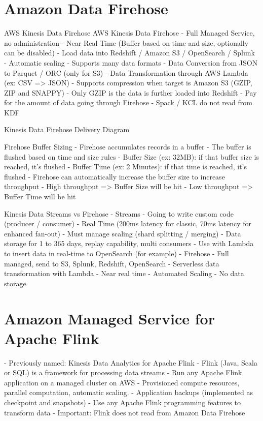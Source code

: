 \documentclass[11pt]{book}
\begin{document}
    \section{Amazon Data Firehose}
    AWS Kinesis Data Firehose
    AWS Kinesis Data Firehose
    - Full Managed Service, no administration
    - Near Real Time (Buffer based on time and size, optionally can be disabled)
    - Load data into Redshift / Amazon S3 / OpenSearch  / Splunk
    - Automatic scaling
    - Supports many data formats
    - Data Conversion from JSON to Parquet / ORC (only for S3)
    - Data Transformation through AWS Lambda (ex: CSV => JSON)
    - Supports compression when target is Amazon S3 (GZIP, ZIP and SNAPPY)
    - Only GZIP is the data is further loaded into Redshift
    - Pay for the amount of data going through Firehose
    - Spack / KCL do not read from KDF

    Kinesis Data Firehose Delivery Diagram

    Firehose Buffer Sizing
    - Firehose accumulates records in a buffer
    - The buffer is flushed based on time and size rules
    - Buffer Size (ex: 32MB): if that buffer size is reached, it's flushed
    - Buffer Time (ex: 2 Minutes): if that time is reached, it's flushed
    - Firehose can automatically increase the buffer size to increase throughput
    - High throughput => Buffer Size will be hit
    - Low throughput => Buffer Time will be hit

    Kinesis Data Streams vs Firehose
    - Streams
        - Going to write custom code (producer / consumer)
        - Real Time (200ms latency for classic, 70ms latency for enhanced fan-out)
        - Must manage scaling (shard splitting / merging)
        - Data storage for 1 to 365 days, replay capability, multi consumers
        - Use with Lambda to insert data in real-time to OpenSearch (for example)
    - Firehose
        - Full managed, send to S3, Splunk, Redshift, OpenSearch
        - Serverless data transformation with Lambda
        - Near real time
        - Automated Scaling
        - No data storage

    \section{Amazon Managed Service for Apache Flink}
    - Previously named: Kinesis Data Analytics for Apache Flink
    - Flink (Java, Scala or SQL) is a framework for processing data streams
    - Run any Apache Flink application on a managed cluster on AWS
        - Provisioned compute resources, parallel computation, automatic scaling.
        - Application backups (implemented as checkpoint and snapshots)
        - Use any Apache Flink programming features to transform data
        - Important: Flink does not read from Amazon Data Firehose
\end{document}

